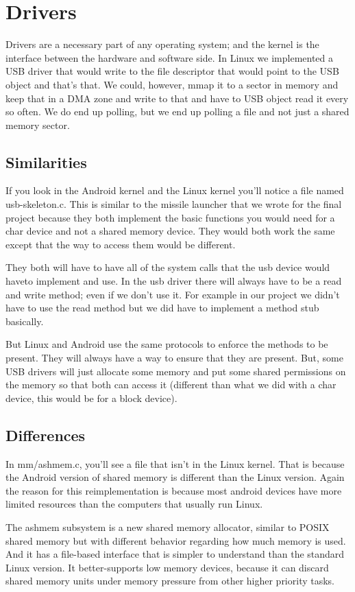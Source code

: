 \documentclass[letterpaper,10pt]{article}
\begin{document}
\section{Drivers}
Drivers are a necessary part of any operating system; and the kernel is the interface between the hardware and software side. In Linux we implemented a USB driver that would write to the file descriptor that would point to the USB object and that's that. We could, however, mmap it to a sector in memory and keep that in a DMA zone and write to that and have to USB object read it every so often. We do end up polling, but we end up polling a file and not just a shared memory sector. 

\subsection{Similarities}
If you look in the Android kernel and the Linux kernel you'll notice a file named usb-skeleton.c. This is similar to the missile launcher that we wrote for the final project because they both implement the basic functions you would need for a char device and not a shared memory device. They would both work the same except that the way to access them would be different. 

They both will have to have all of the system calls that the usb device would haveto implement and use. In the usb driver there will always have to be a read and write method; even if we don't use it. For example in our project we didn't have to use the read method but we did have to implement a method stub basically. 

But Linux and Android use the same protocols to enforce the methods to be present. They will always have a way to ensure that they are present. But, some USB drivers will just allocate some memory and put some shared permissions on the memory so that both can access it (different than what we did with a char device, this would be for a block device). 

\subsection{Differences}
In  mm/ashmem.c, you'll see a file that isn't in the Linux kernel. That is because the Android version of shared memory is different than the Linux version. Again the reason for this reimplementation is because most android devices have more limited resources than the computers that usually run Linux. 

The ashmem subsystem is a new shared memory allocator, similar to POSIX shared memory but with different behavior regarding how much memory is used. And it has a file-based interface that is simpler to understand than the standard Linux version. It better-supports low memory devices, because it can discard shared memory units under memory pressure from other higher priority tasks.
\end{document}
